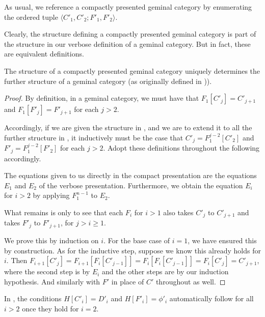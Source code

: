 As usual, we reference a compactly presented geminal category by enumerating the ordered tuple $\langle C'_1, C'_2; F'_1, F'_2 \rangle$.

Clearly, the structure defining a compactly presented geminal category is part of the structure in our verbose definition of a geminal category. But in fact, these are equivalent definitions.

\begin{theorem}\label{GeminalCompactIsVerbose}
The structure of a compactly presented geminal category uniquely determines the further structure of a geminal category (as originally defined in )).
\end{theorem}
\begin{proof}
By definition, in a geminal category, we must have that $F_1[C'_j] = C'_{j + 1}$ and $F_1[F'_j] = F'_{j + 1}$ for each $j > 2$.

Accordingly, if we are given the structure in , and we are to extend it to all the further structure in , it inductively must be the case that $C'_j = F_1^{j - 2}[C'_2]$ and $F'_j = F_1^{j - 2}[F'_2]$ for each $j > 2$. Adopt these definitions throughout the following accordingly.

The equations given to us directly in the compact presentation are the equations $E_1$ and $E_2$ of the verbose presentation. Furthermore, we obtain the equation $E_i$ for $i > 2$ by applying $F_1^{n - 1}$ to $E_2$.

What remains is only to see that each $F_i$ for $i > 1$ also takes $C'_j$ to $C'_{j + 1}$ and takes $F'_j$ to $F'_{j + 1}$, for $j > i \geq 1$.

We prove this by induction on $i$. For the base case of $i = 1$, we have ensured this by construction. As for the inductive step, suppose we know this already holds for $i$. Then $F_{i + 1}[C'_j] = F_{i + 1} [F_i [C'_{j - 1}]] = F_i [F_i [C'_{j - 1}]] = F_i [C'_j] = C'_{j + 1}$, where the second step is by $E_i$ \TODO and the other steps are by our induction hypothesis. And similarly with $F'$ in place of $C'$ throughout as well.
\end{proof}

\begin{corollary}\label{CompactGeminalCatHomoDefn}
In , the conditions $H[C'_i] = D'_i$ and $H[F'_i] = \phi'_i$ automatically follow for all $i > 2$ once they hold for $i = 2$.
\end{corollary}


